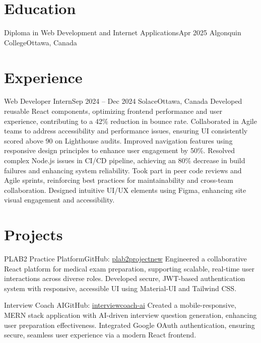\documentclass[a4paper,10pt]{article}
\begin{document}

\section{Education}
\resumeSubheading
{Diploma in Web Development and Internet Applications}{Apr 2025}
{Algonquin College}{Ottawa, Canada}

\section{Experience}
\resumeSubheading
{Web Developer Intern}{Sep 2024 -- Dec 2024}
{Solace}{Ottawa, Canada}
\resumeItemListStart
\resumeItem
{Developed reusable React components, optimizing frontend performance and user experience, contributing to a 42\% reduction in bounce rate.}
\resumeItem
{Collaborated in Agile teams to address accessibility and performance issues, ensuring UI consistently scored above 90\+ on Lighthouse audits.}
\resumeItem
{Improved navigation features using responsive design principles to enhance user engagement by 50\%.}
\resumeItem
{Resolved complex Node.js issues in CI/CD pipeline, achieving an 80\% decrease in build failures and enhancing system reliability.}
\resumeItem
{Took part in peer code reviews and Agile sprints, reinforcing best practices for maintainability and cross-team collaboration.}
\resumeItem
{Designed intuitive UI/UX elements using Figma, enhancing site visual engagement and accessibility.}
\resumeItemListEnd

\section{Projects}
\resumeSubHeadingListStart
\resumeProject
{PLAB2 Practice Platform}{GitHub: \href{https://github.com/altansaid/plab2projectnew}{plab2projectnew}}
\resumeItemListStart
\resumeItem
{Engineered a collaborative React platform for medical exam preparation, supporting scalable, real-time user interactions across diverse roles.}
\resumeItem
{Developed secure, JWT-based authentication system with responsive, accessible UI using Material-UI and Tailwind CSS.}
\resumeItemListEnd

\resumeProject
{Interview Coach AI}{GitHub: \href{https://github.com/altansaid/interviewcoach-ai}{interviewcoach-ai}} 
\resumeItemListStart
\resumeItem
{Created a mobile-responsive, MERN stack application with AI-driven interview question generation, enhancing user preparation effectiveness.}
\resumeItem
{Integrated Google OAuth authentication, ensuring secure, seamless user experience via a modern React frontend.}
\resumeItemListEnd
\resumeSubHeadingListEnd
\end{document}
